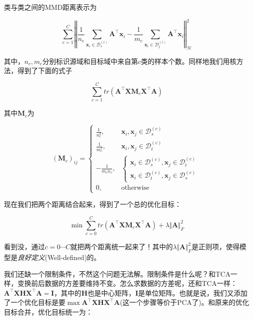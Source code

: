 类与类之间的MMD距离表示为

\begin{equation}
	\sum_{c=1}^{C}\left \Vert \frac{1}{n_c} \sum_{\mathbf{x}_{i} \in \mathcal{D}^{(c)}_s} \mathbf{A}^\top \mathbf{x}_{i} - \frac{1}{m_c} \sum_{\mathbf{x}_{i} \in \mathcal{D}^{(c)}_t} \mathbf{A}^\top \mathbf{x}_{i} \right \Vert ^2_\mathcal{H}
\end{equation}

其中，$n_c,m_c$分别标识源域和目标域中来自第$c$类的样本个数。同样地我们用核方法，得到了下面的式子

\begin{equation}
	\sum_{c=1}^{C}tr(\mathbf{A}^\top \mathbf{X} \mathbf{M}_c \mathbf{X}^\top \mathbf{A})
\end{equation}

其中$\mathbf{M}_c$为

\begin{equation}
	(\mathbf{M}_c)_{ij}=\begin{cases} \frac{1}{n^2_c}, & \mathbf{x}_i,\mathbf{x}_j \in \mathcal{D}^{(c)}_s\\ \frac{1}{m^2_c}, & \mathbf{x}_i,\mathbf{x}_j \in \mathcal{D}^{(c)}_t\\ -\frac{1}{m_c n_c}, & \begin{cases} \mathbf{x}_i \in \mathcal{D}^{(c)}_s ,\mathbf{x}_j \in \mathcal{D}^{(c)}_t \\ \mathbf{x}_i \in \mathcal{D}^{(c)}_t ,\mathbf{x}_j \in \mathcal{D}^{(c)}_s \end{cases}\\ 0, & \text{otherwise}\end{cases}
\end{equation}

现在我们把两个距离结合起来，得到了一个总的优化目标：

\begin{equation}
	\min \sum_{c=0}^{C}tr(\mathbf{A}^\top \mathbf{X} \mathbf{M}_c \mathbf{X}^\top \mathbf{A}) + \lambda \Vert \mathbf{A} \Vert ^2_F
\end{equation}

看到没，通过$c=0 \cdots C$就把两个距离统一起来了！其中的$\lambda \Vert \mathbf{A} \Vert ^2_F$是正则项，使得模型是\textit{良好定义}(Well-defined)的。

我们还缺一个限制条件，不然这个问题无法解。限制条件是什么呢？和TCA一样，变换前后数据的方差要维持不变。怎么求数据的方差呢，还和TCA一样：$\mathbf{A}^\top \mathbf{X} \mathbf{H} \mathbf{X}^\top \mathbf{A} = \mathbf{I}$，其中的$\mathbf{H}$也是中心矩阵，$\mathbf{I}$是单位矩阵。也就是说，我们又添加了一个优化目标是要$\max \mathbf{A}^\top \mathbf{X} \mathbf{H} \mathbf{X}^\top \mathbf{A}$(这一个步骤等价于PCA了)。和原来的优化目标合并，优化目标统一为：


